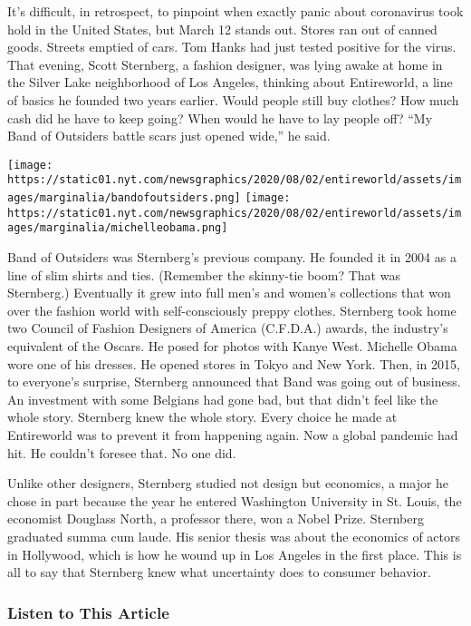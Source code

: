 It's difficult, in retrospect, to pinpoint when exactly panic about
coronavirus took hold in the United States, but March 12 stands out.
Stores ran out of canned goods. Streets emptied of cars. Tom Hanks had
just tested positive for the virus. That evening, Scott Sternberg, a
fashion designer, was lying awake at home in the Silver Lake
neighborhood of Los Angeles, thinking about Entireworld, a line of
basics he founded two years earlier. Would people still buy clothes? How
much cash did he have to keep going? When would he have to lay people
off? ``My Band of Outsiders battle scars just opened wide,'' he said.

\texttt{[image: https://static01.nyt.com/newsgraphics/2020/08/02/entireworld/assets/images/marginalia/bandofoutsiders.png]}
\texttt{[image: https://static01.nyt.com/newsgraphics/2020/08/02/entireworld/assets/images/marginalia/michelleobama.png]}

Band of Outsiders was Sternberg's previous company. He founded it in
2004 as a line of slim shirts and ties. (Remember the skinny-tie boom?
That was Sternberg.) Eventually it grew into full men's and women's
collections that won over the fashion world with self-consciously preppy
clothes. Sternberg took home two Council of Fashion Designers of America
(C.F.D.A.) awards, the industry's equivalent of the Oscars. He posed for
photos with Kanye West. Michelle Obama wore one of his dresses. He
opened stores in Tokyo and New York. Then, in 2015, to everyone's
surprise, Sternberg announced that Band was going out of business. An
investment with some Belgians had gone bad, but that didn't feel like
the whole story. Sternberg knew the whole story. Every choice he made at
Entireworld was to prevent it from happening again. Now a global
pandemic had hit. He couldn't foresee that. No one did.

Unlike other designers, Sternberg studied not design but economics, a
major he chose in part because the year he entered Washington University
in St. Louis, the economist Douglass North, a professor there, won a
Nobel Prize. Sternberg graduated summa cum laude. His senior thesis was
about the economics of actors in Hollywood, which is how he wound up in
Los Angeles in the first place. This is all to say that Sternberg knew
what uncertainty does to consumer behavior.

\hypertarget{listen-to-this-article}{%
\subsubsection{Listen to This Article}\label{listen-to-this-article}}

